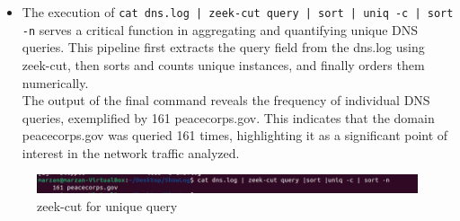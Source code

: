 \begin{itemize}
    \item The execution of \texttt{cat dns.log | zeek-cut query | sort | uniq -c | sort -n}
 serves a critical function in aggregating and quantifying unique DNS queries. This pipeline first extracts the query field from the dns.log using zeek-cut, then sorts and counts unique instances, and finally orders them numerically.\\
    The output of the final command reveals the frequency of individual DNS queries, exemplified by 161 peacecorps.gov. This indicates that the domain peacecorps.gov was queried 161 times, highlighting it as a significant point of interest in the network traffic analyzed.
\end{itemize}


\begin{figure}[H]
    \centering
    \includegraphics[width=1\linewidth]{images/pcap/pcap_5.png}
    \caption{zeek-cut for unique query}
    \label{fig:enter-label}
\end{figure}
